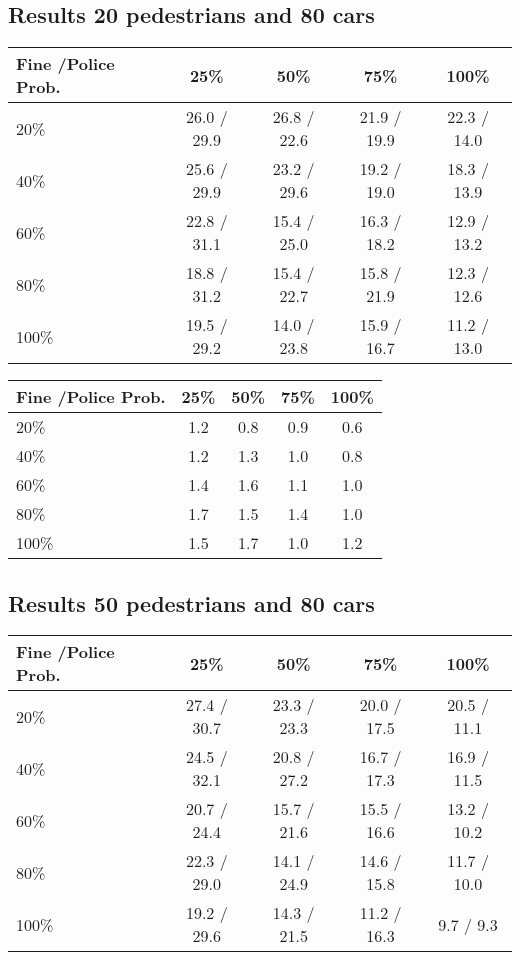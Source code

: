 \documentclass[a4paper]{article}
\begin{document}
\clearpage
\subsection{Results 20 pedestrians and 80 cars}
\begin{table}[H]
\centering
\begin{tabular}{ l | c c c c }
  Fine \slash Police Prob. & 25\% & 50\% & 75\% & 100\% \\ 
  \hline
  20\%  & 26.0 / 29.9 & 26.8 / 22.6 & 21.9 / 19.9 & 22.3 / 14.0  \\
  40\%  & 25.6 / 29.9 & 23.2 / 29.6 & 19.2 / 19.0 & 18.3 / 13.9  \\
  60\%  & 22.8 / 31.1 & 15.4 / 25.0 & 16.3 / 18.2 & 12.9 / 13.2  \\
  80\%  & 18.8 / 31.2 & 15.4 / 22.7 & 15.8 / 21.9 & 12.3 / 12.6  \\
  100\% & 19.5 / 29.2 & 14.0 / 23.8 & 15.9 / 16.7 & 11.2 / 13.0  \\
\end{tabular}
\end{table}

\begin{table}[H]
\centering
\begin{tabular}{ l | c c c c }
  Fine \slash Police Prob. & 25\% & 50\% & 75\% & 100\% \\ 
  \hline
  20\%  & 1.2 & 0.8 & 0.9 & 0.6  \\
  40\%  & 1.2 & 1.3 & 1.0 & 0.8  \\
  60\%  & 1.4 & 1.6 & 1.1 & 1.0  \\
  80\%  & 1.7 & 1.5 & 1.4 & 1.0  \\
  100\% & 1.5 & 1.7 & 1.0 & 1.2  \\
\end{tabular}
\end{table}

\subsection{Results 50 pedestrians and 80 cars}
\begin{table}[H]
\centering
\begin{tabular}{ l | c c c c }
  Fine \slash Police Prob. & 25\% & 50\% & 75\% & 100\% \\ 
  \hline
  20\%  & 27.4 / 30.7 & 23.3 / 23.3 & 20.0 / 17.5 & 20.5 / 11.1  \\
  40\%  & 24.5 / 32.1 & 20.8 / 27.2 & 16.7 / 17.3 & 16.9 / 11.5  \\
  60\%  & 20.7 / 24.4 & 15.7 / 21.6 & 15.5 / 16.6 & 13.2 / 10.2  \\
  80\%  & 22.3 / 29.0 & 14.1 / 24.9 & 14.6 / 15.8 & 11.7 / 10.0  \\
  100\% & 19.2 / 29.6 & 14.3 / 21.5 & 11.2 / 16.3 &  9.7 /  9.3  \\
\end{tabular}
\end{table}
\end{document}
